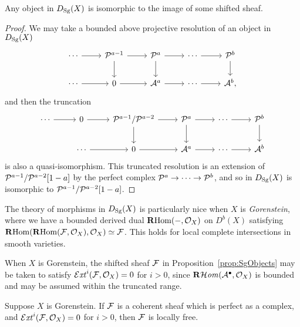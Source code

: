 \begin{proposition}[label=prop:SgObjects]{}{}
    Any object in $D_{\mathrm{Sg}}(X)$ is isomorphic to the image of some shifted sheaf.
\end{proposition}

\begin{proof}
    We may take a bounded above projective resolution of an object in $D_{\mathrm{Sg}}(X)$
    \begin{equation*}
        \begin{tikzcd}
            \cdots \ar[r] & \calP^{a-1} \ar[r] \ar[d] &
            \calP^a \ar[r] \ar[d] & \cdots \ar[r] & \calP^b \ar[d] \\
            \cdots \ar[r] & 0 \ar[r] & \calA^a \ar[r] & \cdots \ar[r] & \calA^b,
        \end{tikzcd}
    \end{equation*}
    and then the truncation
    \begin{equation*}
        \begin{tikzcd}
            \cdots \ar[r] & 0 \ar[r] & \calP^{a-1}/\calP^{a-2} \ar[d] \ar[r] &
            \calP^a \ar[r] \ar[d] & \cdots \ar[r] & \calP^b \ar[d] \\
                & \cdots \ar[r] & 0 \ar[r] &
                \calA^a \ar[r] & \cdots \ar[r] & \calA^b
        \end{tikzcd}
    \end{equation*}
    is also a quasi-isomorphism. This truncated resolution is an extension of
    $\mathcal{P}^{a-1}/\mathcal{P}^{a-2}[1-a]$ by the perfect complex
    $\mathcal{P}^a\to\cdots\to\mathcal{P}^b$, and so in $D_{\mathrm{Sg}}(X)$ is isomorphic to
    $\mathcal{P}^{a-1}/\mathcal{P}^{a-2}[1-a]$.
\end{proof}

The theory of morphisms in $D_{\mathrm{Sg}}(X)$ is particularly nice when $X$ is
\emph{Gorenstein}, where we have a bounded derived dual $\operatorname{\mathbf{R} Hom}(-,\mathcal{O}_X)$ on
$D^b(X)$ satisfying $\operatorname{\mathbf{R} Hom}(\operatorname{\mathbf{R} Hom}(\mathcal{F},\mathcal{O}_X),\mathcal{O}_X)\simeq\mathcal{F}$. This holds for
local complete intersections in smooth varieties.

\begin{remark}[label=rmk:SgObjects]{}{}
    When $X$ is Gorenstein, the shifted sheaf $\mathcal{F}$ in
    Proposition~\ref{prop:SgObjects} may be taken to satisfy
    $\operatorname{\mathcal{E}\mathit{xt}}^i(\mathcal{F},\mathcal{O}_X)=0$ for $i>0$, since $\operatorname{\mathbf{R}\mathcal{H}\mathit{om}}(\mathcal{A}^\bullet,\mathcal{O}_X)$ is
    bounded and may be assumed within the truncated range.
\end{remark}

\begin{proposition}[label=prop:SgLF]{\cite[Lemma 1.20]{OrlovSingularities}}{}
    Suppose $X$ is Gorenstein. If $\mathcal{F}$ is a coherent sheaf which is perfect
    as a complex, and $\operatorname{\mathcal{E}\mathit{xt}}^i(\mathcal{F},\mathcal{O}_X)=0$ for $i>0$, then $\mathcal{F}$ is locally
    free.
\end{proposition}


